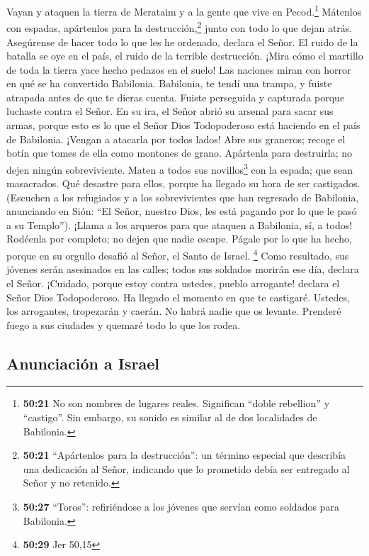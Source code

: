  Vayan y ataquen la tierra de Merataim y a la gente que
vive en Pecod.\footnote{\textbf{50:21} No son nombres de lugares reales.
  Significan ``doble rebellion'' y ``castigo''. Sin embargo, su sonido
  es similar al de dos localidades de Babilonia.} Mátenlos con espadas,
apártenlos para la destrucción,\footnote{\textbf{50:21} ``Apártenlos
  para la destrucción'': un término especial que describía una
  dedicación al Señor, indicando que lo prometido debía ser entregado al
  Señor y no retenido.} junto con todo lo que dejan atrás. Asegúrense de
hacer todo lo que les he ordenado, declara el Señor.  El
ruido de la batalla se oye en el país, el ruido de la terrible
destrucción.  ¡Mira cómo el martillo de toda la tierra
yace hecho pedazos en el suelo! Las naciones miran con horror en qué se
ha convertido Babilonia.  Babilonia, te tendí una trampa,
y fuiste atrapada antes de que te dieras cuenta. Fuiste perseguida y
capturada porque luchaste contra el Señor.  En su ira, el
Señor abrió su arsenal para sacar sus armas, porque esto es lo que el
Señor Dios Todopoderoso está haciendo en el país de Babilonia.
 ¡Vengan a atacarla por todos lados! Abre sus graneros;
recoge el botín que tomes de ella como montones de grano. Apártenla para
destruirla; no dejen ningún sobreviviente.  Maten a todos
sus novillos\footnote{\textbf{50:27} ``Toros'': refiriéndose a los
  jóvenes que servían como soldados para Babilonia.} con la espada; que
sean masacrados. Qué desastre para ellos, porque ha llegado su hora de
ser castigados.  (Escuchen a los refugiados y a los
sobrevivientes que han regresado de Babilonia, anunciando en Sión: ``El
Señor, nuestro Dios, les está pagando por lo que le pasó a su Templo'').
 ¡Llama a los arqueros para que ataquen a Babilonia, sí,
a todos! Rodéenla por completo; no dejen que nadie escape. Págale por lo
que ha hecho, porque en su orgullo desafió al Señor, el Santo de Israel.
\footnote{\textbf{50:29} Jer 50,15}  Como resultado, sus
jóvenes serán asesinados en las calles; todos sus soldados morirán ese
día, declara el Señor.  ¡Cuidado, porque estoy contra
ustedes, pueblo arrogante! declara el Señor Dios Todopoderoso. Ha
llegado el momento en que te castigaré.  Ustedes, los
arrogantes, tropezarán y caerán. No habrá nadie que os levante. Prenderé
fuego a sus ciudades y quemaré todo lo que los rodea.

\hypertarget{anunciaciuxf3n-a-israel}{%
\subsection{Anunciación a Israel}\label{anunciaciuxf3n-a-israel}}

